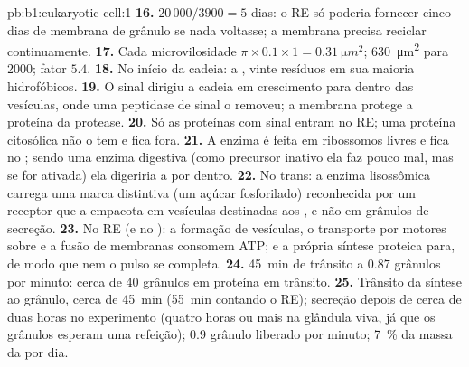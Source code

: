 \begin{solution}{pb:b1:eukaryotic-cell:1}
\textbf{16.} $20\,000/3900 = 5$ dias: o RE só poderia fornecer cinco
dias de membrana de grânulo se nada voltasse; a membrana precisa
reciclar continuamente.
\textbf{17.} Cada microvilosidade $\pi\times 0.1\times 1 =
\qty{0.31}{\micro m^2}$; \qty{630}{\micro m^2} para 2000; fator $5.4$.
\textbf{18.} No início da cadeia: a , vinte resíduos em
sua maioria hidrofóbicos.
\textbf{19.} O sinal dirigiu a cadeia em crescimento para dentro das
vesículas, onde uma peptidase de sinal o removeu; a membrana protege a
proteína da protease.
\textbf{20.} Só as proteínas com sinal entram no RE; uma proteína
citosólica não o tem e fica fora.
\textbf{21.} A enzima é feita em ribossomos livres e fica no ;
sendo uma enzima digestiva (como precursor inativo ela faz pouco mal,
mas se for ativada) ela digeriria a  por dentro.
\textbf{22.} No  trans: a enzima lisossômica carrega uma marca
distintiva (um açúcar fosforilado) reconhecida por um receptor que a
empacota em vesículas destinadas aos , e não em grânulos de
secreção.
\textbf{23.} No RE (e no ): a formação de vesículas, o transporte
por motores sobre  e a fusão de membranas consomem ATP; e a
própria síntese proteica para, de modo que nem o pulso se completa.
\textbf{24.} \qty{45}{min} de trânsito a $0.87$ grânulos por minuto:
cerca de \qty{40}{} grânulos em proteína em trânsito.
\textbf{25.} Trânsito da síntese ao grânulo, cerca de \qty{45}{min}
(\qty{55}{min} contando o RE); secreção depois de cerca de duas horas no
experimento (quatro horas ou mais na glândula viva, já que os grânulos
esperam uma refeição); \qty{0.9}{} grânulo liberado por minuto;
\qty{7}{\%} da massa da  por dia.
\end{solution}
